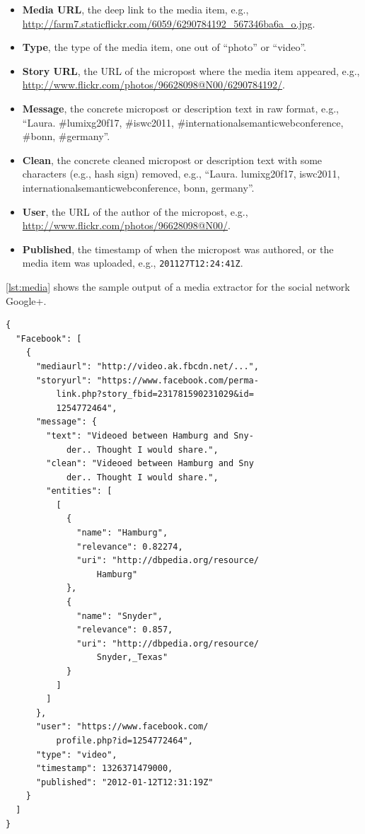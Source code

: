 \documentclass{acm_proc_article-sp}
\newcommand{\inlinelistingsize}{\fontsize{8pt}{11pt}}
\let\oldurl\url
\renewcommand{\url}[1]{\inlinelistingsize\oldurl{#1}}
\begin{document}
\begin{itemize}
  \item	\textbf{Media URL}, the deep link to the media item, e.g., \url{http://farm7.staticflickr.com/6059/6290784192_567346ba6a_o.jpg}.
  \item \textbf{Type}, the type of the media item, one out of ``photo'' or ``video''.
  \item \textbf{Story URL}, the URL of the micropost where the media item appeared, e.g., \url{http://www.flickr.com/photos/96628098@N00/6290784192/}.
  \item \textbf{Message}, the concrete micropost or description text in raw format, e.g., ``Laura. \#lumixg20f17, \#iswc2011, \#internationalsemanticwebconference, \#bonn, \#germany''.
  \item \textbf{Clean}, the concrete cleaned micropost or description text with some characters (e.g., hash sign) removed, e.g., ``Laura. lumixg20f17, iswc2011, internationalsemanticwebconference, bonn, germany''.
  \item \textbf{User}, the URL of the author of the micropost, e.g., \url{http://www.flickr.com/photos/96628098@N00/}.
  \item \textbf{Published}, the timestamp of when the micropost was authored, or the media item was uploaded, e.g., \texttt{2011\-27T12:24:41Z}.
\end{itemize}

\autoref{lst:media} shows the sample output of a media extractor for the social network Google+.

\begin{lstlisting}[caption={Sample output of the media exctractor showing a Facebook post processed with named entity extraction and disambiguation (slightly edited for legibility).},label={lst:media}]
{
  "Facebook": [
    {
      "mediaurl": "http://video.ak.fbcdn.net/...",
      "storyurl": "https://www.facebook.com/perma-
          link.php?story_fbid=231781590231029&id=
          1254772464",
      "message": {
        "text": "Videoed between Hamburg and Sny-
            der.. Thought I would share.",
        "clean": "Videoed between Hamburg and Sny
            der.. Thought I would share.",
        "entities": [
          [
            {
              "name": "Hamburg",
              "relevance": 0.82274,
              "uri": "http://dbpedia.org/resource/
                  Hamburg"
            },
            {
              "name": "Snyder",
              "relevance": 0.857,
              "uri": "http://dbpedia.org/resource/
                  Snyder,_Texas"
            }
          ]
        ]
      },
      "user": "https://www.facebook.com/
          profile.php?id=1254772464",
      "type": "video",
      "timestamp": 1326371479000,
      "published": "2012-01-12T12:31:19Z"
    }
  ]
}
\end{lstlisting}
\end{document}
